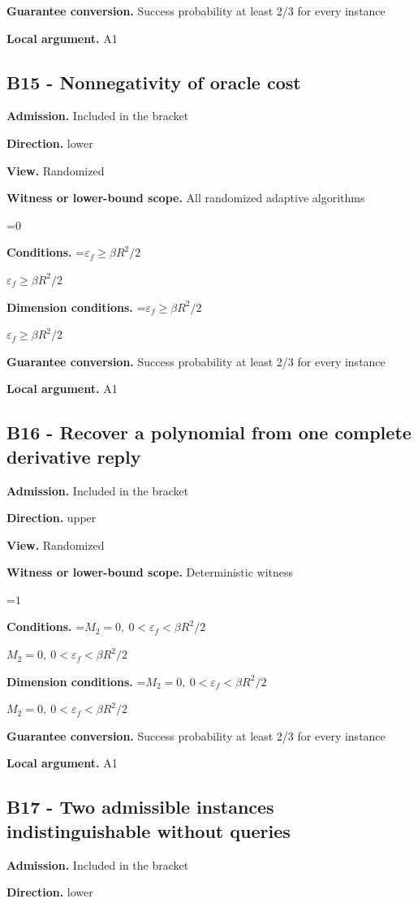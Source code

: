 \documentclass[10pt,a4paper]{article}
\newcommand{\AtlasMath}[1]{\par\begingroup\centering\setbox0=\hbox{$\displaystyle #1$}\ifdim\wd0>1.4\linewidth\typeout{ATLAS WIDE FORMULA: \the\wd0}\fi\ifdim\wd0>\linewidth\resizebox{\linewidth}{!}{\box0}\else\box0\fi\par\endgroup}
\newcommand{\AtlasInlineMath}[1]{\begingroup\setbox0=\hbox{$#1$}\ifdim\wd0>.4\linewidth\endgroup\AtlasMath{#1}\else\endgroup$#1$\fi}
\begin{document}
\textbf{Guarantee conversion.} Success probability at least 2/3 for every instance

\textbf{Local argument.} A1

\subsection{B15 - Nonnegativity of oracle cost}
\textbf{Admission.} Included in the bracket

\textbf{Direction.} lower

\textbf{View.} Randomized

\textbf{Witness or lower-bound scope.} All randomized adaptive algorithms

\AtlasMath{0}
\textbf{Conditions.} \AtlasInlineMath{\varepsilon_f\ge\beta R^2/2}

\textbf{Dimension conditions.} \AtlasInlineMath{\varepsilon_f\ge\beta R^2/2}

\textbf{Guarantee conversion.} Success probability at least 2/3 for every instance

\textbf{Local argument.} A1

\subsection{B16 - Recover a polynomial from one complete derivative reply}
\textbf{Admission.} Included in the bracket

\textbf{Direction.} upper

\textbf{View.} Randomized

\textbf{Witness or lower-bound scope.} Deterministic witness

\AtlasMath{1}
\textbf{Conditions.} \AtlasInlineMath{M_2=0,\ 0<\varepsilon_f<\beta R^2/2}

\textbf{Dimension conditions.} \AtlasInlineMath{M_2=0,\ 0<\varepsilon_f<\beta R^2/2}

\textbf{Guarantee conversion.} Success probability at least 2/3 for every instance

\textbf{Local argument.} A1

\subsection{B17 - Two admissible instances indistinguishable without queries}
\textbf{Admission.} Included in the bracket

\textbf{Direction.} lower
\end{document}
